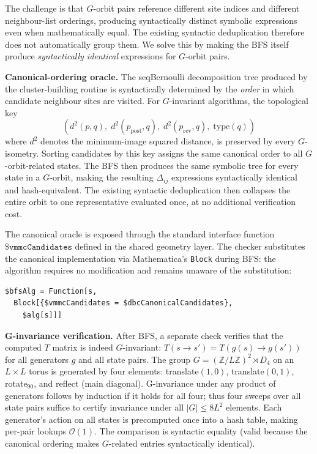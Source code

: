 \documentclass[twocolumn,10pt]{article}
\begin{document}
The challenge is that $G$-orbit pairs reference different site indices and
different neighbour-list orderings, producing syntactically distinct symbolic
expressions even when mathematically equal.  The existing syntactic
deduplication therefore does not automatically group them.  We solve this
by making the BFS itself produce \emph{syntactically identical} expressions
for $G$-orbit pairs.

\medskip\noindent\textbf{Canonical-ordering oracle.}
The seqBernoulli decomposition tree produced by the cluster-building routine
is syntactically determined by the \emph{order} in which candidate neighbour
sites are visited.  For $G$-invariant algorithms, the topological key
\[
  (d^2(p,q),\; d^2(p_\mathrm{post},q),\; d^2(p_\mathrm{rev},q),\; \text{type}(q))
\]
where $d^2$ denotes the minimum-image squared distance, is preserved by every
$G$-isometry.  Sorting candidates by this key assigns the same canonical
order to all $G$-orbit-related states.  The BFS then produces the same
symbolic tree for every state in a $G$-orbit, making the resulting
$\Delta_{ij}$ expressions syntactically identical and hash-equivalent.
The existing syntactic deduplication then collapses the entire orbit to one
representative evaluated once, at no additional verification cost.

The canonical oracle is exposed through the standard interface function
$\texttt{\$vmmcCandidates}$ defined in the shared geometry layer.  The
checker substitutes the canonical implementation via Mathematica's
\texttt{Block} during BFS: the algorithm requires no modification and
remains unaware of the substitution:
\begin{lstlisting}
$bfsAlg = Function[s,
  Block[{$vmmcCandidates = $dbcCanonicalCandidates},
    $alg[s]]]
\end{lstlisting}

\medskip\noindent\textbf{G-invariance verification.}
After BFS, a separate check verifies that the computed $T$ matrix is indeed
$G$-invariant: $T(s\to s') = T(g(s)\to g(s'))$ for all generators $g$ and
all state pairs.  The group $G = (\mathbb{Z}/L\mathbb{Z})^2\rtimes D_4$ on an
$L\times L$ torus is generated by four elements: translate$(1,0)$,
translate$(0,1)$, rotate$_{90}$, and reflect (main diagonal).  G-invariance
under any product of generators follows by induction if it holds for all four;
thus four sweeps over all state pairs suffice to certify invariance under all
$|G|\leq 8L^2$ elements.  Each generator's action on all states is
precomputed once into a hash table, making per-pair lookups $\mathcal{O}(1)$.
The comparison is syntactic equality (valid because the canonical ordering
makes $G$-related entries syntactically identical).
\end{document}
